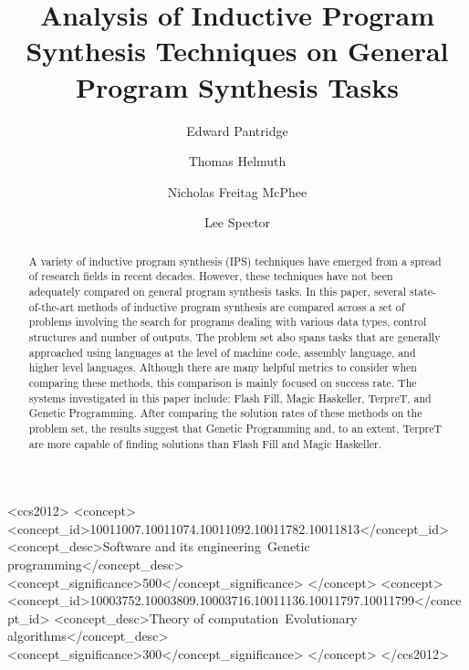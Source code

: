 \documentclass[sigconf]{acmart}
\begin{document}
\title{Analysis of Inductive Program Synthesis Techniques on General Program Synthesis Tasks}

\author{Edward Pantridge}

\author{Thomas Helmuth}

\author{Nicholas Freitag McPhee}

\author{Lee Spector}


\begin{abstract}
	A variety of inductive program synthesis (IPS) techniques have emerged from a spread of research fields in recent decades. However, these techniques have not been adequately compared on general program synthesis tasks. In this paper, several state-of-the-art methods of inductive program synthesis are compared across a set of problems involving the search for programs dealing with various data types, control structures and number of outputs. The problem set also spans tasks that are generally approached using languages at the level of machine code, assembly language, and higher level languages. Although there are many helpful metrics to consider when comparing these methods, this comparison is mainly focused on success rate. The systems investigated in this paper include: Flash Fill, Magic Haskeller, TerpreT, and Genetic Programming. After comparing the solution rates of these methods on the problem set, the results suggest that Genetic Programming and, to an extent, TerpreT are more capable of finding solutions than Flash Fill and Magic Haskeller.
\end{abstract}

%
%
\begin{CCSXML}
<ccs2012>
<concept>
<concept_id>10011007.10011074.10011092.10011782.10011813</concept_id>
<concept_desc>Software and its engineering~Genetic programming</concept_desc>
<concept_significance>500</concept_significance>
</concept>
<concept>
<concept_id>10003752.10003809.10003716.10011136.10011797.10011799</concept_id>
<concept_desc>Theory of computation~Evolutionary algorithms</concept_desc>
<concept_significance>300</concept_significance>
</concept>
</ccs2012>
\end{CCSXML}
\end{document}
